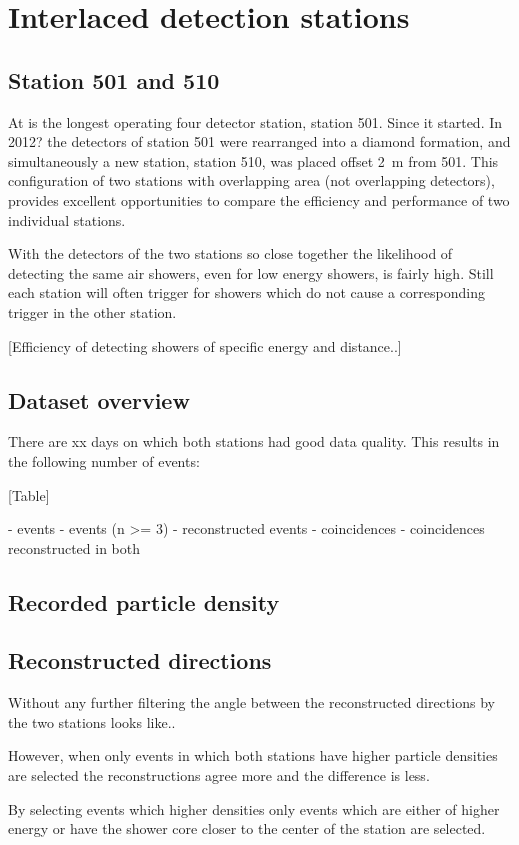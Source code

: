 \chapter{Interlaced detection stations}
\label{ch:501-510}


\section{Station 501 and 510}

At \nikhef is the longest operating four detector station, station 501. Since it started. In 2012? the detectors of station 501 were rearranged into a diamond formation, and simultaneously a new station, station 510, was placed offset \SI{2}{\meter} from 501. This configuration of two stations with overlapping area (not overlapping detectors), provides excellent opportunities to compare the efficiency and performance of two individual stations.

With the detectors of the two stations so close together the likelihood of detecting the same air showers, even for low energy showers, is fairly high. Still each station will often trigger for showers which do not cause a corresponding trigger in the other station.

[Efficiency of detecting showers of specific energy and distance..]


\section{Dataset overview}

There are xx days on which both stations had good data quality. This results in the following number of events:

[Table]

- events
- events (n >= 3)
- reconstructed events
- coincidences
- coincidences reconstructed in both


\section{Recorded particle density}


\section{Reconstructed directions}

Without any further filtering the angle between the reconstructed directions by the two stations looks like..


However, when only events in which both stations have higher particle densities are selected the reconstructions agree more and the difference is less.

By selecting events which higher densities only events which are either of higher energy or have the shower core closer to the center of the station are selected.


\section{}

\section{}
